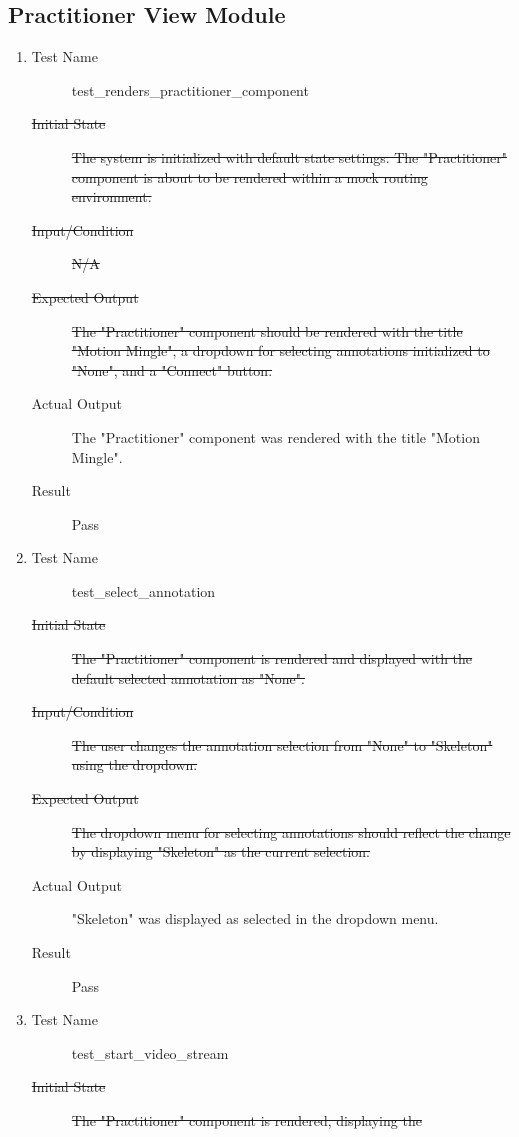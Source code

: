 \documentclass[12pt, titlepage]{article}
\begin{document}
\subsection{Practitioner View Module}
\begin{enumerate}[UT-PV1]
\item \label{UT-PV1}
  \begin{description}
  \item[Test Name] test\_renders\_practitioner\_component
  \item[\sout{Initial State}]\sout{ The system is initialized with default state settings.
    The "Practitioner" component is about to be rendered within a mock routing
    environment.
  }\item[\sout{Input/Condition}]\sout{ N/A
  }\item[\sout{Expected Output}]\sout{ The "Practitioner" component should be rendered with
    the title "Motion Mingle", a dropdown for selecting annotations initialized
    to "None", and a "Connect" button.
  }\item[Actual Output] The "Practitioner" component was rendered with the title
    "Motion Mingle".
  \item[Result] Pass
  \end{description}
\item \label{UT-PV2}
  \begin{description}
  \item[Test Name] test\_select\_annotation
  \item[\sout{Initial State}]\sout{ The "Practitioner" component is rendered and displayed
    with the default selected annotation as "None".
  }\item[\sout{Input/Condition}]\sout{ The user changes the annotation selection from "None"
    to "Skeleton" using the dropdown.
  }\item[\sout{Expected Output}]\sout{ The dropdown menu for selecting annotations should
    reflect the change by displaying "Skeleton" as the current selection.
  }\item[Actual Output] "Skeleton" was displayed as selected in the dropdown
    menu.
  \item[Result] Pass
  \end{description}
\item \label{UT-PV3}
  \begin{description}
  \item[Test Name] test\_start\_video\_stream
  \item[\sout{Initial State}]\sout{ The "Practitioner" component is rendered, displaying the
}
\end{description}
\end{enumerate}
\end{document}
